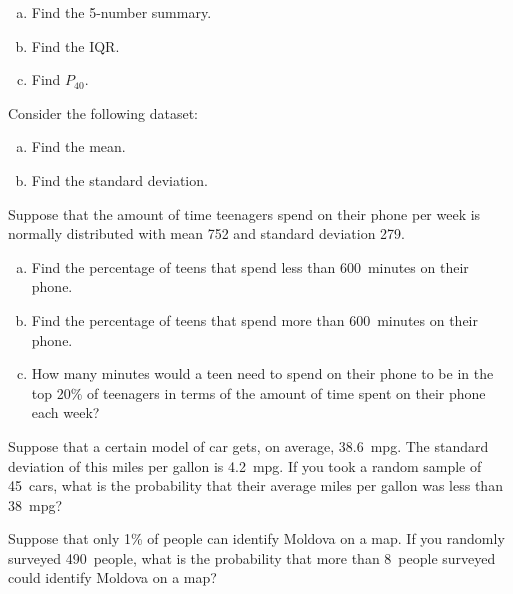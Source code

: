 \documentclass[12pt,letterpaper]{exam}
\begin{document}
\begin{questions}
\begin{enumerate}[(a)]
\item Find the 5-number summary. 
\item Find the IQR. 
\item Find $P_{40}$. 
\end{enumerate}



\newpage
\question[10] Consider the following dataset:
	\begin{enumerate}[(a)]
	\item Find the mean. 
	\item Find the standard deviation. 
	\end{enumerate}



\newpage
\question[10] Suppose that the amount of time teenagers spend on their phone per week is normally distributed with mean 752 and standard deviation 279.
	\begin{enumerate}[(a)]
	\item Find the percentage of teens that spend less than 600~minutes on their phone.
	\item Find the percentage of teens that spend more than 600~minutes on their phone. 
	\item How many minutes would a teen need to spend on their phone to be in the top 20\% of teenagers in terms of the amount of time spent on their phone each week?
	\end{enumerate}



\newpage
\question[10] Suppose that a certain model of car gets, on average, 38.6~mpg. The standard deviation of this miles per gallon is 4.2~mpg. If you took a random sample of 45~cars, what is the probability that their average miles per gallon was less than 38~mpg? 



\newpage
\question[10] Suppose that only 1\% of people can identify Moldova on a map. If you randomly surveyed 490~people, what is the probability that more than 8~people surveyed could identify Moldova on a map? 


\end{questions}
\end{document}
